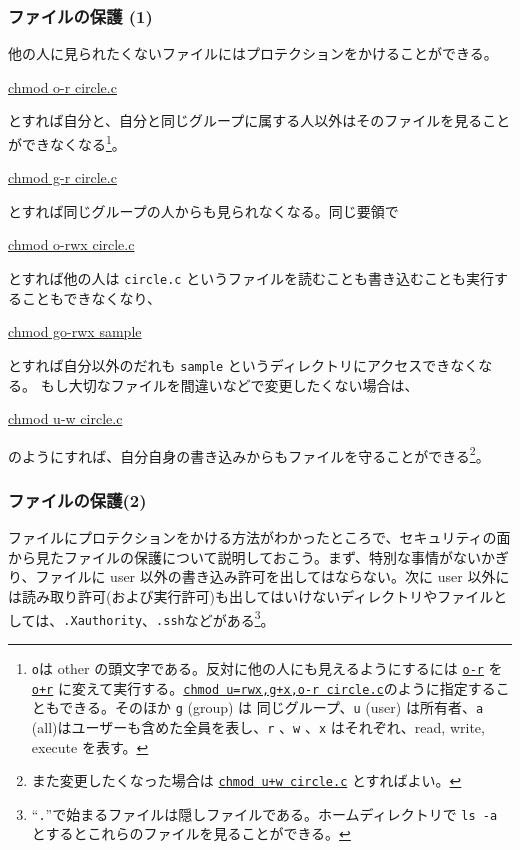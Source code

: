 \subsubsection{ファイルの保護 (1)}
他の人に見られたくないファイルにはプロテクションをかけることができる。
\begin{commandline2}
\prompt \underline{chmod o-r circle.c}
\end{commandline2} \noindent
とすれば自分と、自分と同じグループに属する人以外はそのファイルを見ることができなくなる\footnote{{\tt o}は other の頭文字である。反対に他の人にも見えるようにするには \underline{\tt o-r} を\underline{\tt o+r} に変えて実行する。\underline{\tt chmod u=rwx,g+x,o-r circle.c}のように指定することもできる。そのほか {\tt g} (group) は 同じグループ、{\tt u} (user) は所有者、{\tt a} (all)はユーザーも含めた全員を表し、{\tt r} 、{\tt w} 、{\tt x} はそれぞれ、read, write, execute を表す。}。
\begin{commandline2}
\prompt \underline{chmod g-r circle.c}
\end{commandline2} \noindent
とすれば同じグループの人からも見られなくなる。同じ要領で
\begin{commandline2}
\prompt \underline{chmod o-rwx circle.c}
\end{commandline2} \noindent
とすれば他の人は {\tt circle.c} というファイルを読むことも書き込むことも実行することもできなくなり、
\begin{commandline2}
\prompt \underline{chmod go-rwx sample}
\end{commandline2} \noindent
とすれば自分以外のだれも {\tt sample} というディレクトリにアクセスできなくなる。
もし大切なファイルを間違いなどで変更したくない場合は、
\begin{commandline2}
\prompt \underline{chmod u-w circle.c}
\end{commandline2} \noindent
のようにすれば、自分自身の書き込みからもファイルを守ることができる\footnote{また変更したくなった場合は \underline{\tt chmod u+w circle.c} とすればよい。}。

\subsubsection{ファイルの保護(2)}
ファイルにプロテクションをかける方法がわかったところで、セキュリティの面から見たファイルの保護について説明しておこう。まず、特別な事情がないかぎり、ファイルに user 以外の書き込み許可を出してはならない。次に user 以外には読み取り許可(および実行許可)も出してはいけないディレクトリやファイルとしては、{\tt .Xauthority}、{\tt .ssh}などがある\footnote{``{\tt .}''で始まるファイルは隠しファイルである。ホームディレクトリで {\tt ls -a} とするとこれらのファイルを見ることができる。}。

